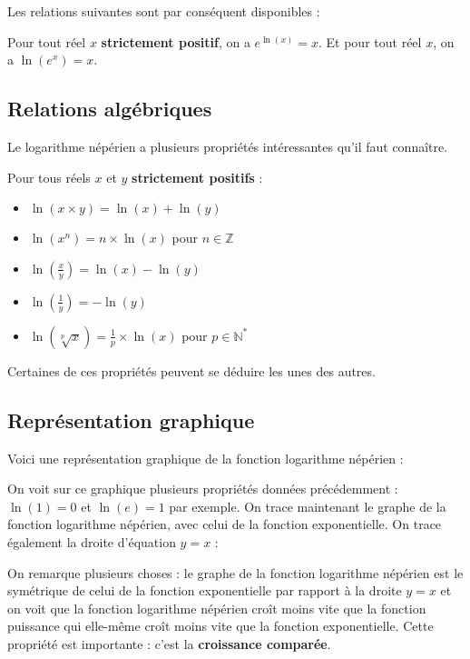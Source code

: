 	Les relations suivantes sont par conséquent disponibles :

	\begin{formula}
		Pour tout réel $x$ \textbf{strictement positif}, on a $e^{\ln(x)} = x$.
		\newpar
		Et pour tout réel $x$, on a $\ln(e^x) = x$.
	\end{formula}

	\subsection{Relations algébriques}

	Le logarithme népérien a plusieurs propriétés intéressantes qu'il faut connaître.

	\begin{formula}[Formules]
		Pour tous réels $x$ et $y$ \textbf{strictement positifs} :
		\begin{itemize}
			\item $\ln(x \times y) = \ln(x) + \ln(y)$
			\item $\ln(x^n) = n \times \ln(x)$ pour $n \in \mathbb{Z}$
			\item $\ln\left(\frac{x}{y}\right) = \ln(x) - \ln(y)$
			\item $\ln\left(\frac{1}{y}\right) = -\ln(y)$
			\item $\ln(\sqrt[p]{x}) = \frac{1}{p} \times \ln(x)$ pour $p \in \mathbb{N}^*$
		\end{itemize}
	\end{formula}

	Certaines de ces propriétés peuvent se déduire les unes des autres.

	\subsection{Représentation graphique}
	\label{representation-graphique}

	Voici une représentation graphique de la fonction logarithme népérien :


	On voit sur ce graphique plusieurs propriétés données précédemment : $\ln(1) = 0$ et $\ln(e) = 1$ par exemple.
	On trace maintenant le graphe de la fonction logarithme népérien, avec celui de la fonction exponentielle. On trace également la droite d'équation $y = x$ :


	On remarque plusieurs choses : le graphe de la fonction logarithme népérien est le symétrique de celui de la fonction exponentielle par rapport à la
	droite $y = x$ et on voit que la fonction logarithme népérien croît moins vite que la fonction puissance qui elle-même croît moins vite que la fonction exponentielle. Cette propriété est importante : c'est la \textbf{croissance comparée}.

